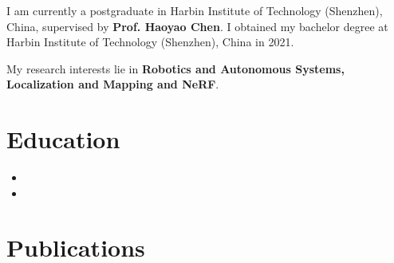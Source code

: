 \documentclass[11pt,a4paper,sans]{moderncv}        %
\begin{document}

\makecvtitle

\small{I am currently a postgraduate in Harbin Institute of Technology (Shenzhen), China, supervised by \textbf{Prof. Haoyao Chen}. I obtained my bachelor degree at Harbin Institute of Technology (Shenzhen), China in 2021.

My research interests lie in \textbf{Robotics and Autonomous Systems, Localization and Mapping and NeRF}. 
}

\section{Education}

\vspace{5pt}

\begin{itemize}



\item{}

\item{}

\end{itemize}

\vspace{2pt}

\section{Publications}

\vspace{5pt}
\end{document}
